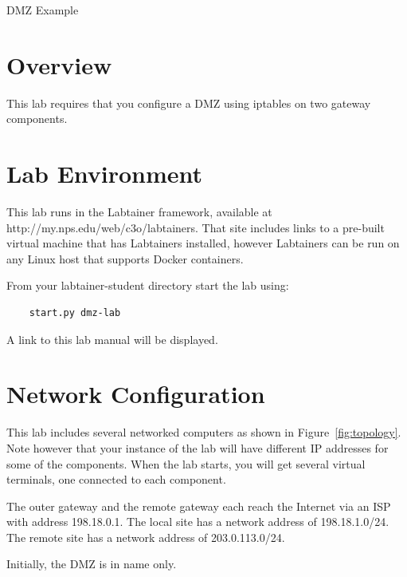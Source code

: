 


\begin{center}
{\LARGE DMZ Example}
\vspace{0.1in}\\
\end{center}

\copyrightnotice

\section{Overview}
This lab requires that you configure a DMZ using iptables on two gateway components.

\section{Lab Environment}
This lab runs in the Labtainer framework,
available at http://my.nps.edu/web/c3o/labtainers.
That site includes links to a pre-built virtual machine
that has Labtainers installed, however Labtainers can
be run on any Linux host that supports Docker containers.

From your labtainer-student directory start the lab using:
\begin{verbatim}
    start.py dmz-lab
\end{verbatim}
\noindent A link to this lab manual will be displayed.  

\section{Network Configuration}
This lab includes several networked computers as shown in Figure~\ref{fig:topology}.
Note however that your instance of the lab will have different IP addresses
for some of the components.
When the lab starts, you will get several virtual terminals, one connected to each
component.

The outer gateway and the remote gateway each reach the Internet via an ISP with 
address 198.18.0.1.  The local site has a network address of 198.18.1.0/24.  The remote
site has a network address of 203.0.113.0/24.

Initially, the DMZ is in name only.

